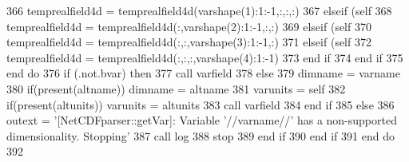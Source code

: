 \begin{DoxyCode}
366                             temprealfield4d = temprealfield4d(varshape(1):1:-1,:,:,:)
367                         \textcolor{keywordflow}{elseif} (self%
368                             temprealfield4d = temprealfield4d(:,varshape(2):1:-1,:,:)
369                         \textcolor{keywordflow}{elseif} (self%
370                             temprealfield4d = temprealfield4d(:,:,varshape(3):1:-1,:)
371                         \textcolor{keywordflow}{elseif} (self%
372                             temprealfield4d = temprealfield4d(:,:,:,varshape(4):1:-1)
373 \textcolor{keywordflow}{                        end if}
374 \textcolor{keywordflow}{                    end if}
375 \textcolor{keywordflow}{                end do}
376                 \textcolor{keywordflow}{if} (.not.bvar) \textcolor{keywordflow}{then}
377                     \textcolor{keyword}{call }varfield%
378                 \textcolor{keywordflow}{else}
379                     dimname = varname
380                     \textcolor{keywordflow}{if}(\textcolor{keyword}{present}(altname)) dimname = altname
381                     varunits = self%
382                     \textcolor{keywordflow}{if}(\textcolor{keyword}{present}(altunits)) varunits = altunits
383                     \textcolor{keyword}{call }varfield%
384 \textcolor{keywordflow}{                end if}
385             \textcolor{keywordflow}{else}
386                 outext = \textcolor{stringliteral}{'[NetCDFparser::getVar]: Variable '}//varname//\textcolor{stringliteral}{' has a non-supported
       dimensionality. Stopping'}
387                 \textcolor{keyword}{call }log%
388                 stop
389 \textcolor{keywordflow}{            end if}
390 \textcolor{keywordflow}{        end if}
391 \textcolor{keywordflow}{    end do}
392 
\end{DoxyCode}
\mbox{\label{namespacenetcdfparser__mod_a0aea819b8a474ce2f4840d0bc44e95ec}} 
